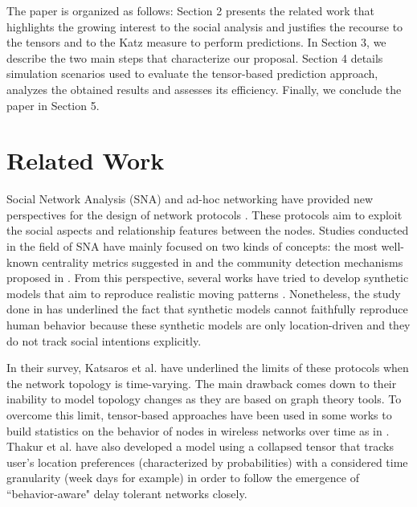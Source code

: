 \documentclass[conference]{IEEEtran}
\begin{document}
The paper is organized as follows: Section 2 presents the related
work that highlights the growing interest to the social analysis and
justifies the recourse to the tensors and to the Katz measure to
perform predictions. In Section 3, we describe the two main steps
that characterize our proposal. Section 4 details simulation
scenarios used to evaluate the tensor-based prediction approach,
analyzes the obtained results and assesses its efficiency. Finally,
we conclude the paper in Section 5.

\section{Related Work}
Social Network Analysis (SNA) \cite{Wasserman1994, Katsaros2010a}
and ad-hoc networking have provided new perspectives for the design
of network protocols \cite{Hui2008, Daly2007, Hossmann2010}. These
protocols aim to exploit the social aspects and relationship
features between the nodes. Studies conducted in the field of SNA
have mainly focused on two kinds of concepts: the most well-known
centrality metrics suggested in
\cite{Wasserman1994,Page1999,Hwang2008,Chung1997} and the community
detection mechanisms proposed in
\cite{Bollobas1998,Newman2006,Palla2005,Wasserman1994}. From this
perspective, several works have tried to develop synthetic models
that aim to reproduce realistic moving patterns
\cite{Hsu2009a,Lee2009}. Nonetheless, the study done in
\cite{Hossmann2010a} has underlined the fact that synthetic models
cannot faithfully reproduce human behavior because these synthetic
models are only location-driven and they do not track social
intentions explicitly.

In their survey, Katsaros et al. \cite{Katsaros2010a} have
underlined the limits of these protocols when the network topology
is time-varying. The main drawback comes down to their inability to
model topology changes as they are based on graph theory tools. To
overcome this limit, tensor-based approaches have been used in some
works to build statistics on the behavior of nodes in wireless
networks over time as in \cite{Acer2010}. Thakur et al.
\cite{Thakur2010} have also developed a model using a collapsed
tensor that tracks user's location preferences (characterized by
probabilities) with a considered time granularity (week days for
example) in order to follow the emergence of ``behavior-aware" delay
tolerant networks closely.
\end{document}
